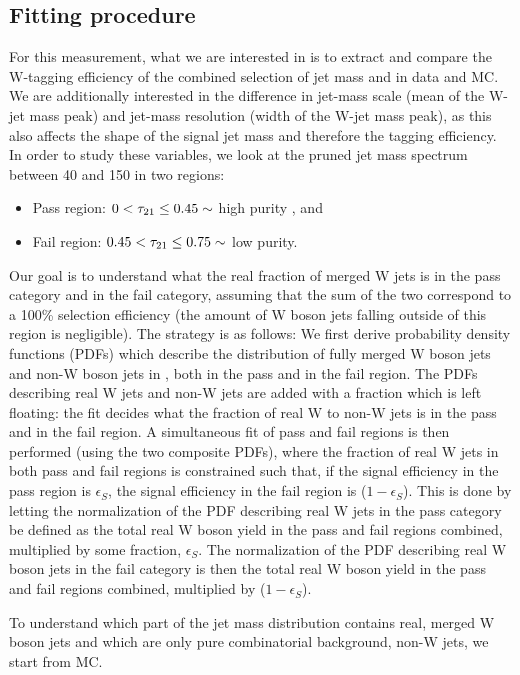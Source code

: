 \subsection{Fitting procedure}
For this measurement, what we are interested in is to extract and compare the W-tagging efficiency of the combined selection of jet mass and \nsubj in data and MC. We are additionally interested in the difference in jet-mass scale (mean of the W-jet mass peak) and jet-mass resolution (width of the W-jet mass peak), as this also affects the shape of the signal jet mass and therefore the tagging efficiency. In order to study these variables, we look at the pruned jet mass spectrum between 40 and 150 \GeV in two regions: 
\begin{itemize}
\itemsep0em 
  \item Pass region: $0 <  \tau_{21} \leq 0.45 \sim$ high purity , and
  \item Fail region: $0.45 < \tau_{21} \leq 0.75\sim$ low purity.
\end{itemize}
Our goal is to understand what the real fraction of merged W jets is in the pass category and in the fail category, assuming that the sum of the two correspond to a 100\% selection efficiency (the amount of W boson jets falling outside of this region is negligible).
The strategy is as follows: We first derive probability density functions (PDFs) which describe the distribution of fully merged W boson jets and non-W boson jets in \ttbar, both in the pass and in the fail region. The PDFs describing real W jets and non-W jets are added with a fraction which is left floating: the fit decides what the fraction of real W to non-W jets is in the pass and in the fail region. A simultaneous fit of pass and fail regions is then performed (using the two composite PDFs), where the fraction of real W jets in both pass and fail regions is constrained such that, if the signal efficiency in the pass region is $\epsilon_S$, the signal efficiency in the fail region is ($1-\epsilon_S$). This is done by letting the normalization of the PDF describing real W jets in the pass category be defined as the total real W boson yield in the pass and fail regions combined, multiplied by some fraction, $\epsilon_S$. The normalization of the PDF describing real W boson jets in the fail category is then the total real W boson yield in the pass and fail regions combined, multiplied by ($1-\epsilon_S$).\par
To understand which part of the \ttbar jet mass distribution contains real, merged W boson jets and which are only pure combinatorial background, non-W jets, we start from \ttbar MC.
